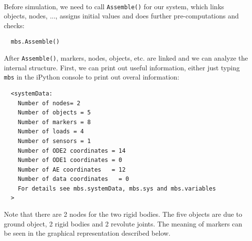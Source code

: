 \horizontalRuler\\
\noindent Before simulation, we need to call \texttt{Assemble()} for our system, which links objects, nodes, ..., assigns initial values and does further pre-computations and checks:
\pythonstyle\begin{lstlisting}
  mbs.Assemble()
\end{lstlisting}
After \texttt{Assemble()}, markers, nodes, objects, etc. are linked and we can analyze the internal structure. First, we can print out useful information, either just typing \texttt{mbs} in the iPython console to print out overal information:
\plainlststyle
\begin{lstlisting}
  <systemData: 
    Number of nodes= 2
    Number of objects = 5
    Number of markers = 8
    Number of loads = 4
    Number of sensors = 1
    Number of ODE2 coordinates = 14
    Number of ODE1 coordinates = 0
    Number of AE coordinates   = 12
    Number of data coordinates   = 0
    For details see mbs.systemData, mbs.sys and mbs.variables
  >
\end{lstlisting}
%
Note that there are 2 nodes for the two rigid bodies. The five objects are due to ground object, 2 rigid bodies and 2 revolute joints.
The meaning of markers can be seen in the graphical representation described below.

